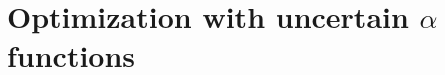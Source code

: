 \chapter{Optimization with uncertain \texorpdfstring{$\alpha$}{alpha} functions}
\label{chap:unc_alpha}
